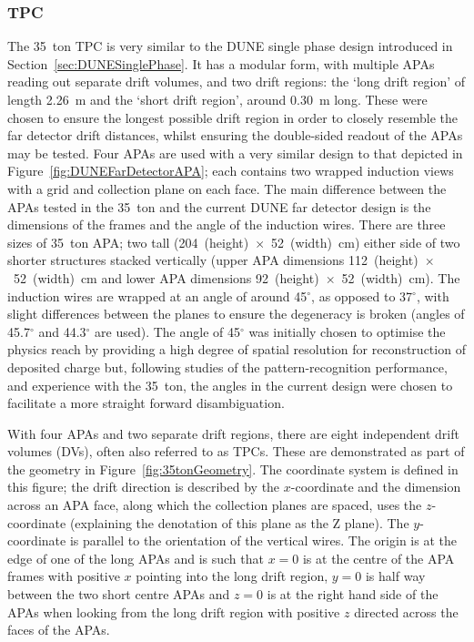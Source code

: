 \subsubsection{TPC}\label{sec:35tonTPC}

The 35~ton TPC is very similar to the DUNE single phase design introduced in Section~\ref{sec:DUNESinglePhase}.  It has a modular form, with multiple APAs reading out separate drift volumes, and two drift regions: the `long drift region' of length 2.26~m and the `short drift region', around 0.30~m long.  These were chosen to ensure the longest possible drift region in order to closely resemble the far detector drift distances, whilst ensuring the double-sided readout of the APAs may be tested.  Four APAs are used with a very similar design to that depicted in Figure~\ref{fig:DUNEFarDetectorAPA}; each contains two wrapped induction views with a grid and collection plane on each face.  The main difference between the APAs tested in the 35~ton and the current DUNE far detector design is the dimensions of the frames and the angle of the induction wires.  There are three sizes of 35~ton APA; two tall (204~(height)~$\times$~52~(width)~cm) either side of two shorter structures stacked vertically (upper APA dimensions 112~(height)~$\times$~52~(width)~cm and lower APA dimensions 92~(height)~$\times$~52~(width)~cm).  The induction wires are wrapped at an angle of around 45$^{\circ}$, as opposed to 37$^{\circ}$, with slight differences between the planes to ensure the degeneracy is broken (angles of 45.7$^{\circ}$ and 44.3$^{\circ}$ are used).  The angle of 45$^{\circ}$ was initially chosen to optimise the physics reach by providing a high degree of spatial resolution for reconstruction of deposited charge but, following studies of the pattern-recognition performance, and experience with the 35~ton, the angles in the current design were chosen to facilitate a more straight forward disambiguation.

With four APAs and two separate drift regions, there are eight independent drift volumes (DVs), often also referred to as TPCs.  These are demonstrated as part of the geometry in Figure~\ref{fig:35tonGeometry}.  The coordinate system is defined in this figure; the drift direction is described by the $x$-coordinate and the dimension across an APA face, along which the collection planes are spaced, uses the $z$-coordinate (explaining the denotation of this plane as the Z plane).  The $y$-coordinate is parallel to the orientation of the vertical wires.  The origin is at the edge of one of the long APAs and is such that $x=0$ is at the centre of the APA frames with positive $x$ pointing into the long drift region, $y=0$ is half way between the two short centre APAs and $z=0$ is at the right hand side of the APAs when looking from the long drift region with positive $z$ directed across the faces of the APAs.

